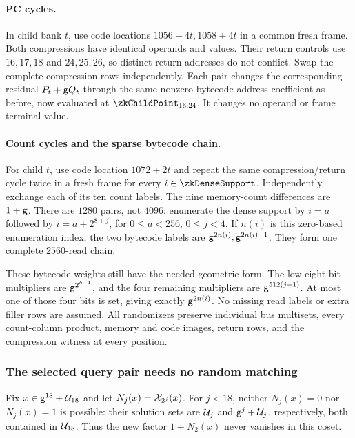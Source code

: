 \paragraph{PC cycles.} In child bank $t$, use code locations $1056+4t,1058+4t$ in a common fresh frame. Both compressions have identical operands and values. Their return controls use $16,17,18$ and $24,25,26$, so distinct return addresses do not conflict. Swap the complete compression rows independently. Each pair changes the corresponding residual $P_t+\mathsf{g} Q_t$ through the same nonzero bytecode-address coefficient as before, now evaluated at $\zkChildPoint_{16:24}$. It changes no operand or frame terminal value.

\paragraph{Count cycles and the sparse bytecode chain.} For child $t$, use code location $1072+2t$ and repeat the same compression/return cycle twice in a fresh frame for every $i\in\zkDenseSupport$. Independently exchange each of its ten count labels. The nine memory-count differences are $1+\mathsf{g}$. There are $1280$ pairs, not $4096$: enumerate the dense support by $i=a$ followed by $i=a+2^{8+j}$, for $0\le a<256$, $0\le j<4$. If $n(i)$ is this zero-based enumeration index, the two bytecode labels are $\mathsf{g}^{2n(i)},\mathsf{g}^{2n(i)+1}$. They form one complete $2560$-read chain.

These bytecode weights still have the needed geometric form. The low eight bit multipliers are $\mathsf{g}^{2^{k+1}}$, and the four remaining multipliers are $\mathsf{g}^{512(j+1)}$. At most one of those four bits is set, giving exactly $\mathsf{g}^{2n(i)}$. No missing read labels or extra filler rows are assumed. All randomizers preserve individual bus multisets, every count-column product, memory and code images, return rows, and the compression witness at every position.

\subsubsection{The selected query pair needs no random matching}

Fix $x\in\mathsf{g}^{18}+\mathcal{U}_{18}$ and let $N_j(x)=\mathcal{X}_{2^j}(x)$. For $j<18$, neither $N_j(x)=0$ nor $N_j(x)=1$ is possible: their solution sets are $\mathcal{U}_j$ and $\mathsf{g}^j+\mathcal{U}_j$, respectively, both contained in $\mathcal{U}_{18}$. Thus the new factor $1+N_2(x)$ never vanishes in this coset.

